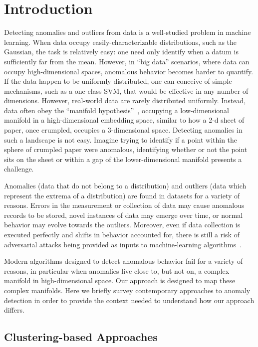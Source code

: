 \section{Introduction}
\label{sec:introduction}

Detecting anomalies and outliers from data is a well-studied problem in machine learning.
When data occupy easily-characterizable distributions, such as the Gaussian, the task is relatively easy:
one need only identify when a datum is sufficiently far from the mean.
However, in ``big data'' scenarios, where data can occupy high-dimensional spaces, anomalous behavior becomes harder to quantify.
If the data happen to be uniformly distributed, one can conceive of simple mechanisms, such as a one-class SVM, that would be effective in any number of dimensions.
However, real-world data are rarely distributed uniformly.
Instead, data often obey the ``manifold hypothesis''~\cite{fefferman2016testing}, occupying a low-dimensional manifold in a high-dimensional embedding space, similar to how a 2-d sheet of paper, once crumpled, occupies a 3-dimensional space.
Detecting anomalies in such a landscape is not easy.
Imagine trying to identify if a point within the sphere of crumpled paper were anomalous, identifying whether or not the point sits on the sheet or within a gap of the lower-dimensional manifold presents a challenge.

Anomalies (data that do not belong to a distribution) and outliers (data which represent the extrema of a distribution) are found in datasets for a variety of reasons.
Errors in the measurement or collection of data may cause anomalous records to be stored,
novel instances of data may emerge over time,
or normal behavior may evolve towards the outliers.
Moreover, even if data collection is executed perfectly and shifts in behavior accounted for, there is still a risk of adversarial attacks being provided as inputs to machine-learning algorithms~\cite{elsayed2018adversarial}.

Modern algorithms designed to detect anomalous behavior fail for a variety of reasons, in particular when anomalies live close to, but not on, a complex manifold in high-dimensional space.
Our approach is designed to map these complex manifolds.
Here we briefly survey contemporary approaches to anomaly detection in order to provide the context needed to understand how our approach differs.

\subsection{Clustering-based Approaches}
\label{subsec:introduction:clustering-based-approaches}

